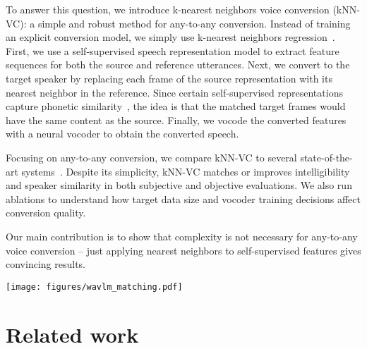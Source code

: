 \documentclass{INTERSPEECH2023}
\def\modelname{{kNN-VC}}
\begin{document}
To answer this question, we introduce k-nearest neighbors voice conversion (\modelname{}): a simple and robust method for any-to-any conversion.
Instead of training an explicit conversion model, we simply use k-nearest neighbors regression~\cite{knn_fix1985discriminatory}.
First, we use a self-supervised speech representation
model to extract feature sequences for both the source and reference utterances.
Next, we convert to the target speaker by replacing each frame of the source representation with its nearest neighbor in the reference.
Since certain self-supervised representations capture phonetic similarity~\cite{chen2022wavlm}, the idea is that the matched target frames would have the same content as the source.
Finally, we vocode the converted features with a neural vocoder to obtain the converted speech.




Focusing on any-to-any conversion, we compare \modelname{} to several state-of-the-art systems~\cite{freevc, vqmivc_wang21n_interspeech,yourtts_v162-casanova22a}.
Despite its simplicity, \modelname{} matches or improves intelligibility and speaker similarity in both subjective and objective evaluations. 
We also run ablations to understand how target data size and vocoder training decisions affect conversion quality.


Our main contribution is to show that complexity is not necessary for any-to-any voice conversion -- just applying nearest neighbors to self-supervised features gives convincing results.





\begin{figure*}[t!]
\centering
\centerline{\texttt{[image: figures/wavlm\_matching.pdf]}}
\caption{
    \modelname{}:
    The source and reference utterance(s) are encoded into self-supervised features from a pretrained WavLM model \cite{chen2022wavlm}.
    Each source feature is assigned to the mean of the  closest features from the reference. 
    The resulting feature sequence is then vocoded using HiFi-GAN     to arrive at the converted waveform output.
}
\label{fig:1_model_arch}
\end{figure*}

\section{Related work}
\end{document}
